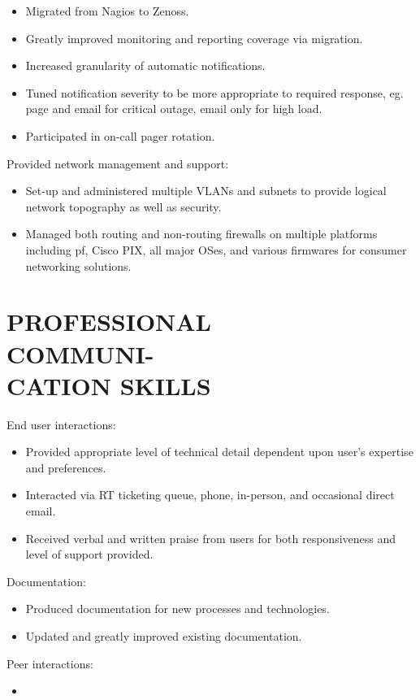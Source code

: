 \documentclass[line,margin]{res}
\begin{document}
\begin{resume}
    \begin{itemize}
        \item Migrated from Nagios to Zenoss.
        \item Greatly improved monitoring and reporting coverage via
        migration.
        \item Increased granularity of automatic notifications.
        \item Tuned notification severity to be more appropriate to
        required response, eg. page and email for critical outage, email
        only for high load.
        \item Participated in on-call pager rotation.
    \end{itemize}
    Provided network management and support: \\
    \begin{itemize}
        \item Set-up and administered multiple VLANs and subnets to
        provide logical network topography as well as security.
        \item Managed both routing and non-routing firewalls on multiple
        platforms including pf, Cisco PIX, all major OSes, and various
        firmwares for consumer networking solutions.
    \end{itemize}

\section{PROFESSIONAL \\ COMMUNI- \\ CATION SKILLS}

    End user interactions: \\
    \begin{itemize}
        \item Provided appropriate level of technical detail dependent
        upon user's expertise and preferences.
        \item Interacted via RT ticketing queue, phone, in-person, and
        occasional direct email.
        \item Received verbal and written praise from users for both
        responsiveness and level of support provided.
    \end{itemize}

    Documentation: \\
    \begin{itemize}
        \item Produced documentation for new processes and technologies.
        \item Updated and greatly improved existing documentation.
    \end{itemize}

    Peer interactions: \\
    \begin{itemize}
        \item

    \end{itemize}


    

\end{resume}
\end{document}
